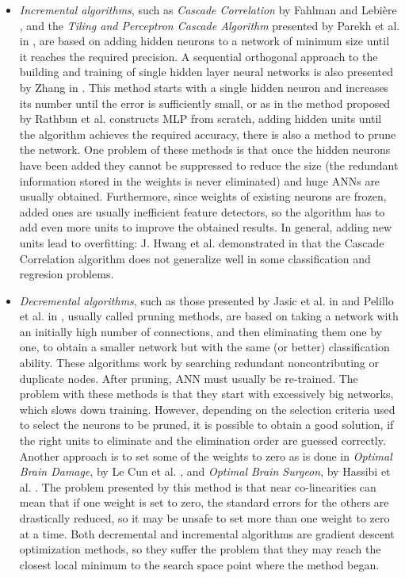 \documentclass{elsart}
\begin{document}
\begin{itemize}
      \item \emph{Incremental algorithms}, such as \emph{Cascade Correlation} by Fahlman and Lebi\`{e}re \cite{FahlmanCASCOR}, and the \emph{Tiling and Perceptron Cascade Algorithm} presented by Parekh et al. in \cite{Parekh}, are based on adding hidden neurons to a network of minimum size until it reaches the required precision.
A sequential orthogonal approach to the building and training of single hidden layer neural networks is also presented by Zhang in \cite{Zhang}. This method starts with a single hidden neuron and increases its number until the error is sufficiently small, or as in the method proposed by Rathbun et al. \cite{Rathbun} constructs MLP from scratch, adding hidden units until the algorithm achieves the required accuracy, there is also a method to prune the network.
One problem of these methods is that once the hidden neurons have been added they cannot be suppressed to reduce the size (the redundant information stored in the weights is never eliminated) and huge ANNs are usually obtained. Furthermore, since weights of existing neurons are frozen, added ones are usually inefficient feature detectors, so the algorithm has to add even more units to improve the obtained results. In general, adding new units lead to overfitting: J. Hwang et al. demonstrated in \cite{Hwang} that the Cascade Correlation algorithm does not generalize well in some classification and regresion problems.

      \item \emph{Decremental algorithms}, such as those presented by Jasic et al. in \cite{Jasic} and Pelillo et al. in \cite{Pelillo}, usually called pruning methods, are based on taking a network with an initially high number of connections, and then eliminating them one by one, to obtain a smaller network but with the same (or better) classification ability.
These algorithms work by searching redundant noncontributing or duplicate nodes.
After pruning, ANN must usually be re-trained. The problem with these methods is that they start with excessively big networks, which slows down training. However, depending on the selection criteria used to select the neurons to be pruned, it is possible to obtain a good solution, if the right units to eliminate and the elimination order are guessed correctly.
Another approach is to set some of the weights to zero as is done in \emph{Optimal Brain Damage}, by Le Cun et al. \cite{LeCun}, and \emph{Optimal Brain Surgeon}, by Hassibi et al. \cite{Hassibi}. The problem presented by this method is that near co-linearities can mean that if one weight is set to zero, the standard errors for the others are drastically reduced, so it may be unsafe to set more than one weight to zero at a time. 
Both decremental and incremental algorithms are gradient descent optimization methods, so they suffer the problem that they may reach the closest local minimum to the search space point where the method began.\\
\end{itemize}
\end{document}
